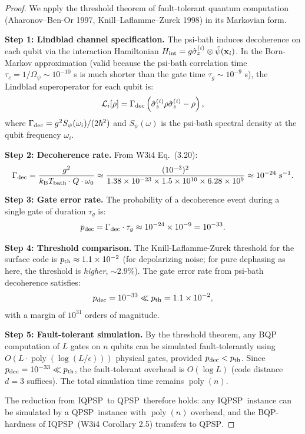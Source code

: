 \documentclass[11pt]{article}
\theoremstyle{definition}
\theoremstyle{remark}
\newcommand{\kB}{k_{\mathrm{B}}}
\newcommand{\QPSP}{\textsc{QPSP}}
\newcommand{\IQPSP}{\textsc{IQPSP}}
\newcommand{\Opsi}{\Omega_\psi}
\newcommand{\ee}[1]{\times 10^{#1}}
\DeclareMathOperator{\poly}{poly}
\begin{document}
\begin{proof}
We apply the threshold theorem of fault-tolerant quantum computation
(Aharonov--Ben-Or 1997, Knill--Laflamme--Zurek 1998) in its Markovian
form.

\textbf{Step 1: Lindblad channel specification.}
The psi-bath induces decoherence on each qubit via the interaction
Hamiltonian $H_{\rm int} = g\hat{\sigma}_z^{(i)}\otimes\hat{\psi}
(\mathbf{x}_i)$. In the Born-Markov approximation (valid because the
psi-bath correlation time $\tau_c = 1/\Opsi \sim 10^{-10}$ s is much
shorter than the gate time $\tau_g \sim 10^{-9}$ s), the Lindblad
superoperator for each qubit is:
\begin{equation}
\mathcal{L}_i[\rho] = \Gamma_{\rm dec}\left(
  \hat{\sigma}_z^{(i)}\rho\hat{\sigma}_z^{(i)} - \rho
\right),
\end{equation}
where $\Gamma_{\rm dec} = g^2 S_\psi(\omega_i)/(2\hbar^2)$ and
$S_\psi(\omega)$ is the psi-bath spectral density at the qubit
frequency $\omega_i$.

\textbf{Step 2: Decoherence rate.}
From W3i4 Eq.~(3.20):
\begin{equation}
\Gamma_{\rm dec} = \frac{g^2}{\kB T_{\rm bath}\cdot Q\cdot\omega_0}
\approx \frac{(10^{-3})^2}{1.38\ee{-23}\times1.5\times10^{10}
\times 6.28\ee{9}} \approx 10^{-24}~\text{s}^{-1}.
\label{eq:gamma_dec}
\end{equation}

\textbf{Step 3: Gate error rate.}
The probability of a decoherence event during a single gate of duration
$\tau_g$ is:
\begin{equation}
p_{\rm dec} = \Gamma_{\rm dec}\cdot\tau_g
\approx 10^{-24}\times 10^{-9} = 10^{-33}.
\end{equation}

\textbf{Step 4: Threshold comparison.}
The Knill-Laflamme-Zurek threshold for the surface code is
$p_{\rm th} \approx 1.1\times10^{-2}$ (for depolarizing noise; for
pure dephasing as here, the threshold is \emph{higher}, $\sim 2.9\%$).
The gate error rate from psi-bath decoherence satisfies:
\begin{equation}
p_{\rm dec} = 10^{-33} \ll p_{\rm th} = 1.1\ee{-2},
\end{equation}
with a margin of $10^{31}$ orders of magnitude.

\textbf{Step 5: Fault-tolerant simulation.}
By the threshold theorem, any BQP computation of $L$ gates on $n$ qubits
can be simulated fault-tolerantly using $O(L\cdot\poly(\log(L/\epsilon)))$
physical gates, provided $p_{\rm dec} < p_{\rm th}$. Since
$p_{\rm dec} = 10^{-33} \ll p_{\rm th}$, the fault-tolerant overhead is
$O(\log L)$ (code distance $d = 3$ suffices). The total simulation time
remains $\poly(n)$.

The reduction from \IQPSP\ to \QPSP\ therefore holds: any \IQPSP\
instance can be simulated by a \QPSP\ instance with $\poly(n)$ overhead,
and the BQP-hardness of \IQPSP\ (W3i4 Corollary 2.5) transfers to
\QPSP.
\end{proof}
\end{document}
